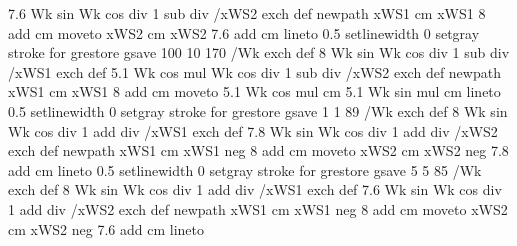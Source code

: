 {{{                        {7.6 Wk sin Wk cos div 1 sub div} /xWS2 exch def
                        newpath
                        xWS1 cm xWS1 8 add cm moveto
                        xWS2 cm xWS2 7.6 add cm
                        lineto
                        0.5 setlinewidth
                        0 setgray
                        stroke
                      } for
  grestore
  gsave
    100 10 170 { /Wk exch def
                          {8 Wk sin Wk cos div 1 sub div} /xWS1 exch def
                          {5.1 Wk cos mul  Wk cos div 1 sub div} /xWS2 exch def
                          newpath
                          xWS1 cm xWS1 8 add cm moveto
                         5.1 Wk cos mul cm 5.1 Wk sin mul cm
                         lineto
                         0.5 setlinewidth
                         0 setgray
                        stroke
                     } for
  grestore
  gsave
     1 1 89 { /Wk exch def
                   {8 Wk sin Wk cos div 1 add div} /xWS1 exch def
                   {7.8 Wk sin Wk cos div 1 add div} /xWS2 exch def
                   newpath
                   xWS1 cm xWS1 neg 8 add cm moveto
                   xWS2 cm xWS2 neg 7.8 add cm
                  lineto
                  0.5 setlinewidth
                  0 setgray
                  stroke
               } for
  grestore
  gsave
      5 5 85 { /Wk exch def
                    {8 Wk sin Wk cos div 1 add div} /xWS1 exch def
                    {7.6 Wk sin Wk cos div 1 add div} /xWS2 exch def
                    newpath
                    xWS1 cm xWS1 neg 8 add cm moveto
                    xWS2 cm xWS2 neg 7.6 add cm
                   lineto
}}}
